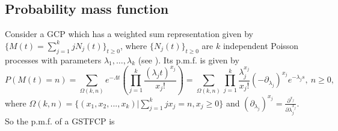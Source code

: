 \documentclass[11pt,oneside,reqno]{amsart}
\theoremstyle{definition}
\theoremstyle{remarkstyle}
\begin{document}
\subsection{Probability mass function}
Consider a GCP which has a weighted sum representation given by $\{M(t)=\sum_{j=1}^{k}jN_j(t)\}_{t\ge 0}$, where $\{N_j(t)\}_{t\ge 0}$ are $k$ independent Poisson processes with parameters $\lambda_1,\dots,\lambda_k$ (see \citet{Dhillon2024}). Its p.m.f. is given by 
\begin{equation*}
P(M(t)=n)=\sum_{\Omega(k,n)}e^{-\Lambda t}(\prod_{j=1}^{k}\frac{(\lambda_j t)^{x_j}}{x_j!})=\sum_{\Omega(k,n)}\prod_{j=1}^{k}\frac{\lambda_j^{x_j}}{x_j!}(-\partial_{\lambda_j})^{x_j}e^{-\lambda_j s},~n\ge 0,    
\end{equation*}
where $\Omega(k,n)= \{(x_1,x_2,...,x_k)|\sum_{j=1}^{k}jx_j=n, x_j\ge 0\}$ and $(\partial_{\lambda_j})^{x_j} = \frac{\partial^{x_j}}{\partial \lambda_j^{x_j}}$. So the p.m.f. of a GSTFCP is
\end{document}
